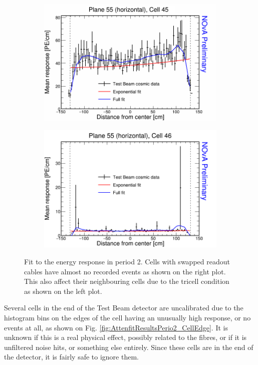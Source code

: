 \begin{figure}[h]
  \begin{subfigure}{0.5\textwidth}
    \includegraphics[width=\linewidth]{RelativeCalibrationResults/p2_055_045.png}
  \end{subfigure}
  \begin{subfigure}{0.5\textwidth}
    \includegraphics[width=\linewidth]{RelativeCalibrationResults/p2_055_046.png}
  \end{subfigure}
  \caption{Fit to the energy response in period 2. Cells with swapped readout cables have almost no recorded events as shown on the right plot. This also affect their neighbouring cells due to the tricell condition as shown on the left plot.}
  \label{fig:AttenfitResultsPerio2_SwappedCables}
\end{figure}

Several cells in the end of the Test Beam detector are uncalibrated due to the histogram bins on the edges of the cell having an unusually high response, or no events at all, as shown on Fig. \ref{fig:AttenfitResultsPerio2_CellEdge}. It is unknown if this is a real physical effect, possibly related to the fibres, or if it is unfiltered noise hits, or something else entirely. Since these cells are in the end of the detector, it is fairly safe to ignore them.

